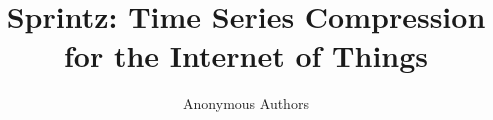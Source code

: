 \documentclass[acmlarge]{acmart}
\begin{document}



\title{Sprintz: Time Series Compression for the Internet of Things}


\author{Anonymous Authors}
\end{document}
